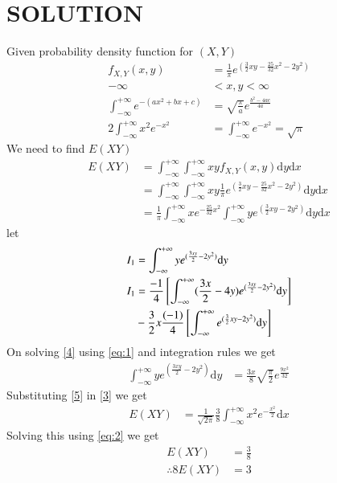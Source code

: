 \documentclass[journal,12pt,twocolumn]{IEEEtran}
\begin{document}
\section*{SOLUTION}
Given probability density function for $(X,Y)$
\begin{align}
f_{X,Y}(x,y)&=\frac{1}{\pi}e^{(\frac{3}{2}xy-\frac{25}{32}x^2-2y^2)}\\ \label{1}
-\infty &< x,y < \infty \\
\int_{-\infty}^{+\infty} e^{-(ax^2+bx+c)} &= \sqrt{\frac{\pi}{a}}e^{\frac{b^2-4ac}{4a}} \label{eq:1} \\
2\int_{-\infty}^{+\infty}x^2 e^{-x^2} &= \int_{-\infty}^{+\infty} e^{-x^2}=\sqrt{\pi} \label{eq:2} 
\end{align}
We need to find $E(XY)$
\begin{align}
E(XY)&= \int_{-\infty}^{+\infty}\int_{-\infty}^{+\infty} xyf_{X,Y}(x,y)\mathrm{d}y \mathrm{d}x \label{2}\\
&=\int_{-\infty}^{+\infty}\int_{-\infty}^{+\infty} xy \frac{1}{\pi}e^{(\frac{3}{2}xy-\frac{25}{32}x^2-2y^2)} \mathrm{d}y \mathrm{d}x \\
&=\frac{1}{\pi}\int_{-\infty}^{+\infty} xe^{-\frac{25}{32}x^2 } \int_{-\infty}^{+\infty} y e^{(\frac{3}{2}xy-2y^2)} \mathrm{d}y \mathrm{d}x \label{3}
\end{align}
let 
\begin{align}
I_1&=\int_{-\infty}^{+\infty} y e^{(\frac{3xy}{2}-2y^2)} \mathrm{d}y \label{eq:3} \\
I_1 &= \frac{-1}{4} {}\left[\int_{-\infty}^{+\infty}(\frac{3x}{2}-4y)e^{(\frac{3xy}{2}-2y^2)} \mathrm{d}y\right] \notag \\
& -\frac{3}{2}x\frac{(-1)}{4} {}\left[\int_{-\infty}^{+\infty}e^{(\frac{3}{2}xy-2y^2)} \mathrm{d}y \right] \label{4}
\end{align}
On solving \eqref{4} using \eqref{eq:1} and integration rules we get
\begin{align}
\int_{-\infty}^{+\infty} y e^{(\frac{3xy}{2}-2y^2)} \mathrm{d}y &= \frac{3x}{8} \sqrt{\frac{\pi}{2}}e^{\frac{9x^2}{32}} \label{5}
\end{align}
Substituting \eqref{5} in \eqref{3} we get
\begin{align}
E(XY)&=\frac{1}{\sqrt{2\pi}}\frac{3}{8}\int_{-\infty}^{+\infty} x^2e^{-\frac{x^2}{2} } \mathrm{d}x
\end{align}
Solving this using \eqref{eq:2} we get
\begin{align}
E(XY)&=\frac{3}{8} \label{6}\\
\therefore 8E(XY)&=3
\end{align}
\end{document}
